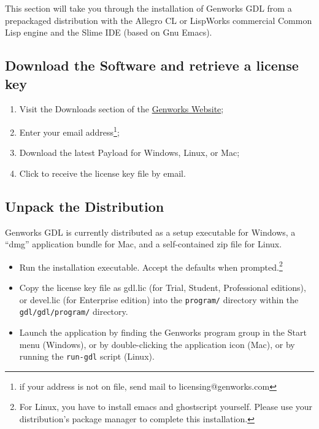 \documentclass [11pt]{book}
\begin{document}
This section will take you through the installation of
Genworks GDL from a prepackaged distribution with the Allegro CL or
LispWorks commercial Common Lisp engine and the Slime IDE (based on
Gnu Emacs).

\subsection{Download the Software and retrieve a license key}

\label{subsec:downloadthesoftwareandretrievealicensekey}



\begin{enumerate}

\item Visit the Downloads section of the \href{http://genworks.com}{Genworks Website};

\item Enter your email address\footnote{if your address is not on file, send mail to licensing@genworks.com};

\item Download the latest Payload for Windows, Linux, or Mac;

\item Click to receive the license key file by email.

\end{enumerate}



\subsection{Unpack the Distribution}

\label{subsec:unpackthedistribution}

Genworks GDL is currently distributed as a setup executable for Windows,
a ``dmg'' application bundle for Mac, and a self-contained zip file for Linux.

\begin{itemize}

\item Run the installation executable. Accept the defaults when prompted.\footnote{For Linux, you have to install emacs and ghostscript yourself. Please use your distribution's package manager to complete this installation.}

\item Copy the license key file as gdl.lic (for Trial,
	 Student, Professional editions), or devel.lic (for Enterprise edition) into the \texttt{program/} directory within the \texttt{gdl/gdl/program/} directory.

\item Launch the application by finding the Genworks program group in the Start menu (Windows), or by double-clicking the application icon (Mac), or by running the \texttt{run-gdl} script (Linux).

\end{itemize}
\end{document}
